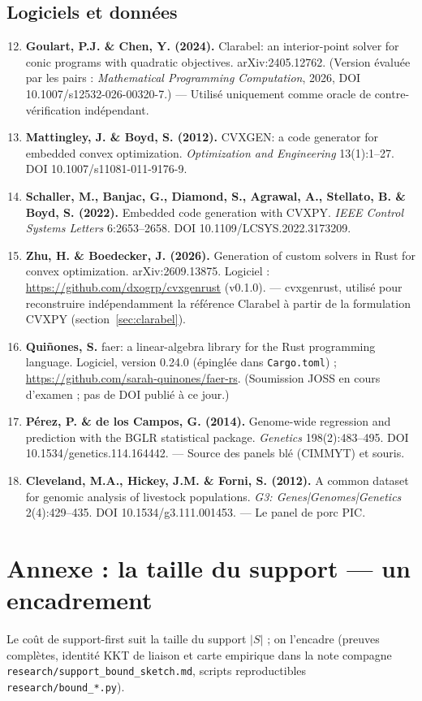 \documentclass[11pt]{article}
\begin{document}
\subsection*{Logiciels et données}
\begin{enumerate}\setcounter{enumi}{11}
\item \textbf{Goulart, P.J. \& Chen, Y. (2024).} Clarabel: an interior-point solver for conic programs with quadratic objectives. arXiv:2405.12762. (Version évaluée par les pairs : \emph{Mathematical Programming Computation}, 2026, DOI 10.1007/s12532-026-00320-7.) --- Utilisé uniquement comme oracle de contre-vérification indépendant.
\item \textbf{Mattingley, J. \& Boyd, S. (2012).} CVXGEN: a code generator for embedded convex optimization. \emph{Optimization and Engineering} 13(1):1--27. DOI 10.1007/s11081-011-9176-9.
\item \textbf{Schaller, M., Banjac, G., Diamond, S., Agrawal, A., Stellato, B. \& Boyd, S. (2022).} Embedded code generation with CVXPY. \emph{IEEE Control Systems Letters} 6:2653--2658. DOI 10.1109/LCSYS.2022.3173209.
\item \textbf{Zhu, H. \& Boedecker, J. (2026).} Generation of custom solvers in Rust for convex optimization. arXiv:2609.13875. Logiciel : \url{https://github.com/dxogrp/cvxgenrust} (v0.1.0). --- cvxgenrust, utilisé pour reconstruire indépendamment la référence Clarabel à partir de la formulation CVXPY (section~\ref{sec:clarabel}).
\item \textbf{Quiñones, S.} faer: a linear-algebra library for the Rust programming language. Logiciel, version 0.24.0 (épinglée dans \texttt{Cargo.toml}) ; \url{https://github.com/sarah-quinones/faer-rs}. (Soumission JOSS en cours d'examen ; pas de DOI publié à ce jour.)
\item \textbf{Pérez, P. \& de los Campos, G. (2014).} Genome-wide regression and prediction with the BGLR statistical package. \emph{Genetics} 198(2):483--495. DOI 10.1534/genetics.114.164442. --- Source des panels blé (CIMMYT) et souris.
\item \textbf{Cleveland, M.A., Hickey, J.M. \& Forni, S. (2012).} A common dataset for genomic analysis of livestock populations. \emph{G3: Genes|Genomes|Genetics} 2(4):429--435. DOI 10.1534/g3.111.001453. --- Le panel de porc PIC.
\end{enumerate}

\section*{Annexe : la taille du support --- un encadrement}
Le coût de support-first suit la taille du support $|S|$ ; on l'encadre (preuves complètes, identité KKT de liaison et carte empirique dans la note compagne \texttt{research/support\_bound\_sketch.md}, scripts reproductibles \texttt{research/bound\_*.py}).
\end{document}
